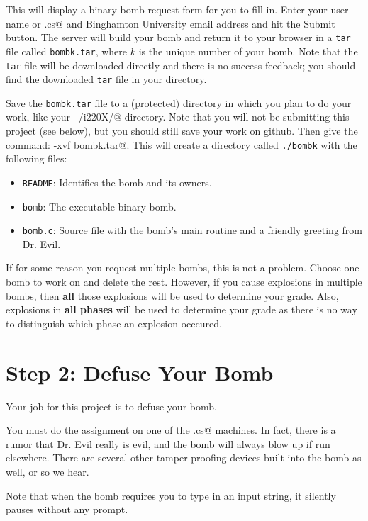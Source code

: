 \documentclass[11pt]{article}
\begin{document}
This will display a binary bomb request form for you to fill in.
Enter your user name or \verb@remote.cs@ and Binghamton University
email address and hit the Submit button.  The server will build your
bomb and return it to your browser in a \texttt{tar} file called
\texttt{bombk.tar}, where $k$ is the unique number of your bomb.  Note
that the \texttt{tar} file will be downloaded directly and there is no
success feedback; you should find the downloaded \texttt{tar} file in
your \verb@Downloads@ directory.

Save the \texttt{bombk.tar} file to a (protected) directory in which
you plan to do your work, like your \verb@~/i220X/@ directory.  Note
that you will not be submitting this project (see below), but you
should still save your work on github.  Then give the command:
\verb@tar -xvf bombk.tar@.  This will create a directory called
\texttt{./bombk} with the following files:
\begin{itemize}
\item \texttt{README}: Identifies the bomb and its owners.
\item \texttt{bomb}: The executable binary bomb.
\item \texttt{bomb.c}: Source file with the bomb's main routine and a friendly greeting from Dr. Evil.
\end{itemize}

If for some reason you request multiple bombs, this is not a
problem. Choose one bomb to work on and delete the rest.  However, if
you cause explosions in multiple bombs, then {\bf all} those
explosions will be used to determine your grade.  Also, explosions in
{\bf all phases} will be used to determine your grade as there is no
way to distinguish which phase an explosion occcured.

\section*{Step 2: Defuse Your Bomb}
Your job for this project is to defuse your bomb.

You must do the assignment on one of the \verb@remote.cs@ machines.
In fact, there is a rumor that Dr. Evil really is evil, and the bomb
will always blow up if run elsewhere.  There are several other
tamper-proofing devices built into the bomb as well, or so we hear.

Note that when the bomb requires you to type in an input string, it
silently pauses without any prompt.
\end{document}
